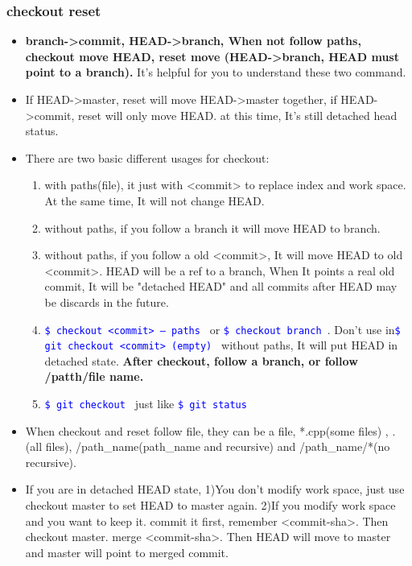 \documentclass[a4paper,12pt,twoside]{book}
\newcommand{\linuxcommand}[1]{\texttt{\textcolor{blue}{\$ #1 \Pisymbol{psy}{191}}}}
\begin{document}
\subsubsection{checkout reset}

\begin{itemize}
		\item \textbf{branch->commit, HEAD->branch, When not follow paths, checkout move HEAD, reset move (HEAD->branch, HEAD must point to a branch). } It's helpful for you to understand these two command.
		
		\item If HEAD->master, reset will move HEAD->master together, if HEAD->commit, reset will only move HEAD. at this time, It's still detached head status. 
		
		\item There are two basic different usages for checkout: 
		\begin{enumerate}
		\item with paths(file), it just with <commit> to replace index and work space. At the same time, It will not change HEAD. 
		\item without paths, if you follow a branch it will move HEAD to branch.
		\item without paths, if you follow a old <commit>, It will move HEAD to old <commit>. HEAD will be a ref to a branch,  When It points a real old commit, It will be "detached HEAD" and all commits after HEAD may be discards in the future. 
		\item \linuxcommand{checkout <commit> -- paths} or \linuxcommand{checkout branch}. Don't use in\linuxcommand{git checkout <commit> (empty)} without paths, It will put HEAD in detached state. \textbf{After checkout, follow a branch, or follow /patth/file name.}
		\item \linuxcommand{git checkout} just like \linuxcommand{git status}
		\end{enumerate}
				
		\item When checkout and reset follow file, they can be a file, *.cpp(some files) , . (all files),  /path\_name(path\_name and recursive) and /path\_name/*(no recursive). 

	 \item If you are in detached HEAD state, 1)You don't modify work space, just use checkout master to set HEAD to master again. 2)If you modify work space and you want to keep it. commit it first, remember <commit-sha>. Then checkout master. merge <commit-sha>. Then HEAD will move to master and master will point to merged commit.  
	 

\end{itemize}
\end{document}
